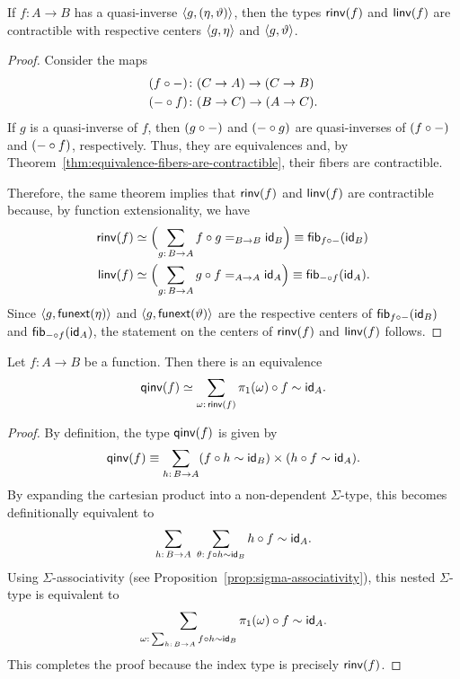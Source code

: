 \begin{prop}\fe\label{prop:side-inverses-are-contractible}
    If\/ $f\colon A\to B$ has a quasi-inverse\/ $\langle g,(\eta,\vartheta)\rangle$, then the types\/ $\mathsf{rinv}(f)$ and\/ $\mathsf{linv}(f)$ are contractible with respective centers\/ $\langle g,\eta\rangle$ and\/ $\langle g,\vartheta\rangle$.
\end{prop}

\begin{proof}
    Consider the maps
    \begin{align*}
        (f\circ\dummy)&\colon(C\to A)\to(C\to B)\\
        (\dummy\circ f)&\colon(B\to C)\to(A\to C).
    \end{align*}
    If\/ $g$ is a quasi-inverse of\/ $f$, then\/ $(g\circ{\mathord-})$ and\/ $({\mathord-}\circ g)$ are quasi-inverses of\/ $(f\circ{\mathord-})$ and\/ $({\mathord-}\circ f)$, respectively. Thus, they are equivalences and, by Theorem~\ref{thm:equivalence-fibers-are-contractible}, their fibers are contractible. 
    
    Therefore, the same theorem implies that\/ $\mathsf{rinv}(f)$ and\/ $\mathsf{linv}(f)$ are contractible because, by function extensionality, we have
    \begin{align*}
        \fun{rinv}(f)
            &\simeq\Bigl(
                \sum_{g\colon B\to A}
                    f\circ g\eq{B\to B}\id_B
            \Bigr)
            \equiv\fun{fib}_{f\circ\dummy}(\id_B)\\
        \fun{linv}(f)
            &\simeq\Bigl(
                \sum_{g\colon B\to A}
                    g\circ f\eq{A\to A}\id_A
            \Bigr)
            \equiv\fun{fib}_{\dummy\circ f}(\id_A).
    \end{align*}
    Since\/ $\langle g,\mathsf{funext}(\eta)\rangle$ and\/ $\langle g,\mathsf{funext}(\vartheta)\rangle$ are the respective centers of\/ $\mathsf{fib}_{f\circ{\mathord-}}(\mathsf{id}_B)$ and\/ $\mathsf{fib}_{{\mathord-}\circ f}(\mathsf{id}_A)$, the statement on the centers of\/ $\mathsf{rinv}(f)$ and\/ $\mathsf{linv}(f)$ follows.
\end{proof}

\begin{lem}\label{lem:qinv-reassociation}
    Let\/ $f\colon A\to B$ be a function. Then there is an equivalence
    \[
        \fun{qinv}(f)\simeq
            \sum_{\omega\colon\fun{rinv}(f)}\pi_1(\omega)\circ f\sim\id_A.
    \]
\end{lem}

\begin{proof}
    By definition, the type $\mathsf{qinv}(f)$ is given by
    \[
        \fun{qinv}(f)\equiv\sum_{h\colon B\to A}
            (f\circ h\sim\id_B)\times(h\circ f\sim\id_A).
    \]
    By expanding the cartesian product into a non-dependent $\Sigma$-type, this becomes definitionally equivalent to
    \[
        \sum_{h\colon B\to A}\;\sum_{\theta\colon f\circ h\sim\id_B}h\circ f\sim\id_A.
    \]
    Using $\Sigma$-associativity (see Proposition~\ref{prop:sigma-associativity}), this nested $\Sigma$-type is equivalent to
    \[
        \sum_{\omega\colon\sum_{h\colon B\to A}f\circ h\sim\id_B}\pi_1(\omega)\circ f\sim\id_A.
    \]
    This completes the proof because the index type is precisely $\mathsf{rinv}(f)$.
\end{proof}

